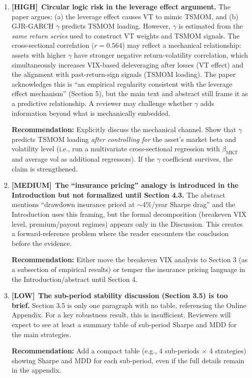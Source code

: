 \documentclass[12pt,a4paper]{article}
\newcommand{\HIGH}{\textcolor{highsev}{\textbf{[HIGH]}}}
\newcommand{\MEDIUM}{\textcolor{medsev}{\textbf{[MEDIUM]}}}
\newcommand{\LOW}{\textcolor{lowsev}{\textbf{[LOW]}}}
\begin{document}
\begin{enumerate}[label=\textbf{1.\arabic*}]

\item \HIGH\ \textbf{Circular logic risk in the leverage effect argument.}
The paper argues: (a) the leverage effect causes VT to mimic TSMOM, and (b) GJR-GARCH $\gamma$ predicts TSMOM loading. However, $\gamma$ is estimated from the \textit{same return series} used to construct VT weights and TSMOM signals. The cross-sectional correlation ($r = 0.564$) may reflect a mechanical relationship: assets with higher $\gamma$ have stronger negative return-volatility correlation, which simultaneously increases VIX-based deleveraging after losses (VT effect) and the alignment with past-return-sign signals (TSMOM loading). The paper acknowledges this is ``an empirical regularity consistent with the leverage effect mechanism'' (Section 5), but the main text and abstract still frame it as a predictive relationship. A reviewer may challenge whether $\gamma$ adds information beyond what is mechanically embedded.

\textbf{Recommendation:} Explicitly discuss the mechanical channel. Show that $\gamma$ predicts TSMOM loading \textit{after controlling for} the asset's market beta and volatility level (i.e., run a multivariate cross-sectional regression with $\beta_{\text{MKT}}$ and average vol as additional regressors). If the $\gamma$ coefficient survives, the claim is strengthened.

\item \MEDIUM\ \textbf{The ``insurance pricing'' analogy is introduced in the Introduction but not formalized until Section 4.3.}
The abstract mentions ``drawdown insurance priced at $\sim$4\%/year Sharpe drag'' and the Introduction uses this framing, but the formal decomposition (breakeven VIX level, premium/payout regimes) appears only in the Discussion. This creates a forward-reference problem where the reader encounters the conclusion before the evidence.

\textbf{Recommendation:} Either move the breakeven VIX analysis to Section 3 (as a subsection of empirical results) or temper the insurance pricing language in the Introduction/abstract until Section 4.

\item \LOW\ \textbf{The sub-period stability discussion (Section 3.5) is too brief.}
Section 3.5 is only one paragraph with no table, referencing the Online Appendix. For a key robustness result, this is insufficient. Reviewers will expect to see at least a summary table of sub-period Sharpe and MDD for the main strategies.

\textbf{Recommendation:} Add a compact table (e.g., 4 sub-periods $\times$ 4 strategies) showing Sharpe and MDD for each sub-period, even if the full details remain in the appendix.

\end{enumerate}
\end{document}
